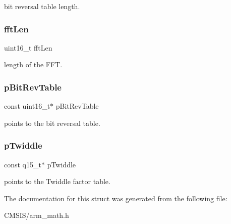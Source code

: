 bit reversal table length. \mbox{\label{structarm__cfft__instance__q15_ab8db3bbe7c61e6bb8ca2a55e3446e11a}} 
\subsubsection{\texorpdfstring{fftLen}{fftLen}}
{\footnotesize\ttfamily uint16\+\_\+t fft\+Len}

length of the F\+FT. \mbox{\label{structarm__cfft__instance__q15_a3b229432d381b0a511a9cdbe3aa74e78}} 
\subsubsection{\texorpdfstring{pBitRevTable}{pBitRevTable}}
{\footnotesize\ttfamily const uint16\+\_\+t$\ast$ p\+Bit\+Rev\+Table}

points to the bit reversal table. \mbox{\label{structarm__cfft__instance__q15_a7f19217cfa0370f9e518caa882265386}} 
\subsubsection{\texorpdfstring{pTwiddle}{pTwiddle}}
{\footnotesize\ttfamily const q15\+\_\+t$\ast$ p\+Twiddle}

points to the Twiddle factor table. 

The documentation for this struct was generated from the following file\+:\begin{DoxyCompactItemize}
\item 
C\+M\+S\+I\+S/arm\+\_\+math.\+h\end{DoxyCompactItemize}
